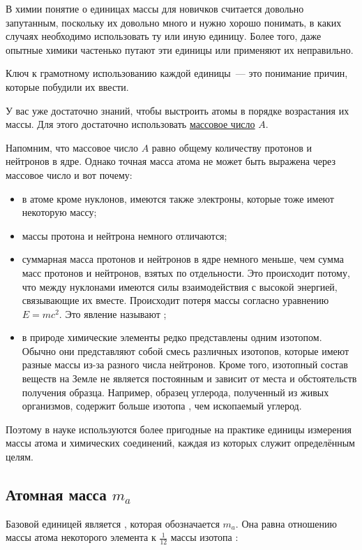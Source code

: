 В химии понятие о единицах массы для новичков считается довольно запутанным, поскольку их довольно много и нужно хорошо понимать, в каких случаях необходимо использовать ту или иную единицу. Более того, даже опытные химики частенько путают эти единицы или применяют их неправильно.

Ключ к грамотному использованию каждой единицы~--- это понимание причин, которые побудили их ввести.

У вас уже достаточно знаний, чтобы выстроить атомы в порядке возрастания их массы. Для этого достаточно использовать \hyperref[sec:nuclear_numbers]{массовое число} $A$.

Напомним, что массовое число $A$ равно общему количеству протонов и нейтронов в ядре. Однако точная масса атома не может быть выражена через массовое число и вот почему:

\begin{itemize}
    \item в атоме кроме нуклонов, имеются также электроны, которые тоже имеют некоторую массу;
    \item массы протона и нейтрона немного отличаются;
    \item суммарная масса протонов и нейтронов в ядре немного меньше, чем сумма масс протонов и нейтронов, взятых по отдельности. Это происходит потому, что между нуклонами имеются силы взаимодействия с высокой энергией, связывающие их вместе. Происходит потеря массы согласно уравнению $E = mc^2$. Это явление называют ;
    \item в природе химические элементы редко представлены одним изотопом. Обычно они представляют собой смесь различных изотопов, которые имеют разные массы из-за разного числа нейтронов. Кроме того, изотопный состав веществ на Земле не является постоянным и зависит от места и обстоятельств получения образца. Например, образец углерода, полученный из живых организмов, содержит больше изотопа , чем ископаемый углерод.
\end{itemize}

Поэтому в науке используются более пригодные на практике единицы измерения массы атома и химических соединений, каждая из которых служит определённым целям.

\subsection*{Атомная масса $m_a$}

Базовой единицей является , которая обозначается $m_a$. Она равна отношению массы атома некоторого элемента  к $\frac{1}{12}$ массы изотопа :

